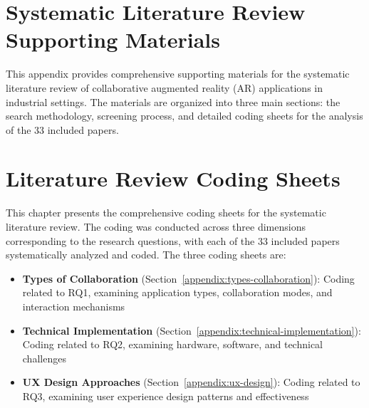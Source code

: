 \appendix

\chapter{Systematic Literature Review Supporting Materials}
\label{appendix:literature-review}

This appendix provides comprehensive supporting materials for the systematic literature review of collaborative augmented reality (AR) applications in industrial settings. The materials are organized into three main sections: the search methodology, screening process, and detailed coding sheets for the analysis of the 33 included papers.



\clearpage



\clearpage

\chapter{Literature Review Coding Sheets}
\label{appendix:coding-sheets}

This chapter presents the comprehensive coding sheets for the systematic literature review. The coding was conducted across three dimensions corresponding to the research questions, with each of the 33 included papers systematically analyzed and coded. The three coding sheets are:

\begin{itemize}
    \item \textbf{Types of Collaboration} (Section~\ref{appendix:types-collaboration}): Coding related to RQ1, examining application types, collaboration modes, and interaction mechanisms
    \item \textbf{Technical Implementation} (Section~\ref{appendix:technical-implementation}): Coding related to RQ2, examining hardware, software, and technical challenges
    \item \textbf{UX Design Approaches} (Section~\ref{appendix:ux-design}): Coding related to RQ3, examining user experience design patterns and effectiveness
\end{itemize}



\clearpage



\clearpage



\clearpage



\clearpage



\clearpage


